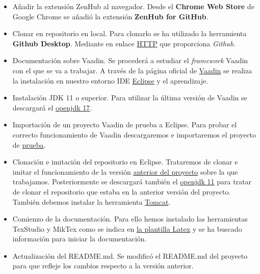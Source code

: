 \begin{itemize}
	
	\item Añadir la extensión ZenHub al navegador. 
	Desde el \textbf{Chrome Web Store} de Google Chrome se añadió la extensión \textbf{ZenHub for GitHub}. 
	
	\item Clonar en repositorio en local. Para clonarlo se ha utilizado la herramienta \textbf{Github Desktop}. Mediante en enlace \href{https://github.com/drg1006/Gestor-TFG-2022.git}{HTTP} que proporciona \emph{Github}.
	
	\item Documentación sobre Vaadin. Se procederá a estudiar el \emph{framework} Vaadin con el que se va a trabajar. A través de la página oficial de \href{https://vaadin.com/}{Vaadin} se realiza la instalación en nuestro entorno IDE \href{https://www.eclipse.org/ide/}{Eclipse} y el aprendizaje.
	
	\item Instalación JDK 11 o superior. Para utilizar la última versión de Vaadin se descargará el  \href{https://www.oracle.com/java/technologies/downloads/#jdk17-windows}{openjdk 17}. 
	
	\item Importación de un proyecto Vaadin de prueba a Eclipse. Para probar el correcto funcionamiento de Vaadin descargaremos e importaremos el proyecto de \href{https://vaadin.com/docs/latest/guide/quick-start}{prueba}.
	
	\item Clonación e imitación del repositorio en Eclipse. Trataremos de clonar e imitar el funcionamiento de la versión \href{https://github.com/dbo1001/Gestor-TFG-2021}{anterior del proyecto} sobre la que trabajamos.
	Posteriormente se descargará también el \href{https://www.oracle.com/java/technologies/downloads/#java11-windows}{openjdk 11} para tratar de clonar el repositorio que estaba en la anterior versión del proyecto. También debemos instalar la herramienta \href{https://tomcat.apache.org/}{Tomcat}.
	
	\item Comienzo de la documentación. Para ello hemos instalado las herramientas TexStudio y MikTex como se indica en \href{https://github.com/ubutfgm/plantillaLatex}{la plantilla Latex} y se ha buscado información para iniciar la documentación.
	
	\item Actualización del README.md. 
	Se modificó el README.md del proyecto para que refleje los cambios respecto a la versión anterior. 
	

\end{itemize}
